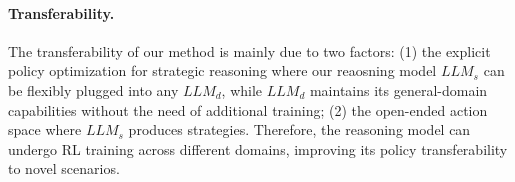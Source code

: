 \paragraph{\textbf{Transferability.}} 
The transferability of our method is mainly due to two factors: (1) the explicit policy optimization for strategic reasoning where our reaosning model $LLM_s$ can be flexibly plugged into any $LLM_d$, while $LLM_d$ maintains its general-domain capabilities without the need of additional training; (2) the open-ended action space where $LLM_s$ produces strategies. Therefore, the reasoning model can undergo RL training across different domains, improving its policy transferability to novel scenarios.








